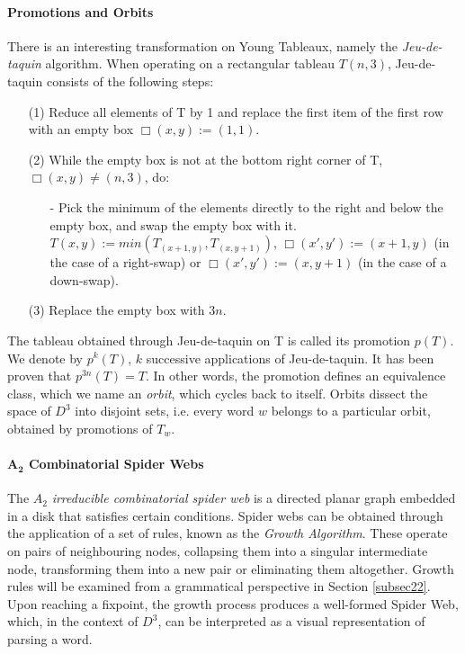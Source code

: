 \documentclass{llncs}
\begin{document}
\paragraph{\textbf{Promotions and Orbits}}
There is an interesting transformation on Young Tableaux, namely the \textit{Jeu-de-taquin} algorithm. When operating on a rectangular tableau $T(n,3)$, Jeu-de-taquin consists of the following steps:
\begin{enumerate}
\item[(1)] Reduce all elements of T by 1 and replace the first item of the first row with an empty box $ \Box (x,y) := (1,1)$.
\item[(2)] While the empty box is not at the bottom right corner of T, $ \Box(x,y) \neq (n,3)$, do:
\begin{enumerate}
\item[-] Pick the minimum of the elements directly to the right and below the empty box, and swap the empty box with it. $ T(x, y) := min(T_{(x+1,y)}, T_{(x,y+1)})$, $ \Box (x',y') := (x+1, y)$ (in the case of a right-swap) or $\Box (x',y') := (x,y+1)$ (in the case of a down-swap).
\end{enumerate}
\item[(3)] Replace the empty box with $3n$.
\end{enumerate}

The tableau obtained through Jeu-de-taquin on T is called its promotion $p(T)$. We denote by $p^k(T)$, $k$ successive applications of Jeu-de-taquin. It has been proven that $p^{3n}(T)=T$\cite{petersen}. In other words, the promotion defines an equivalence class, which we name an \textit{orbit}, which cycles back to itself. Orbits dissect the space of $D^3$ into disjoint sets, i.e. every word $w$ belongs to a particular orbit, obtained by promotions of $T_w$.

\paragraph{\textbf{$\mathbf{A_2}$ Combinatorial Spider Webs}}
The $A_2$ \textit{irreducible combinatorial spider web} is a directed planar graph embedded in a disk that satisfies certain conditions\cite{kuperberg}. Spider webs can be obtained through the application of a set of rules, known as the \textit{Growth Algorithm}\cite{petersen}. These operate on pairs of neighbouring nodes, collapsing them into a singular intermediate node, transforming them into a new pair or eliminating them altogether. Growth rules will be examined from a grammatical perspective in Section \ref{subsec22}. Upon reaching a fixpoint, the growth process produces a well-formed Spider Web, which, in the context of $D^3$, can be interpreted as a visual representation of parsing a word\cite{moortgat,petersen}.
\end{document}
